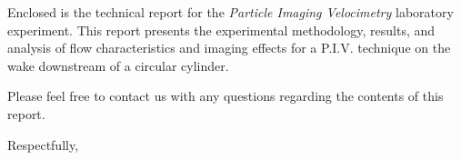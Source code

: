 



\fancyhead[C]{}
\fancyheadwidth[L]{0.5\headwidth}
\fancyheadwidth[C]{0.0\headwidth}
\fancyheadwidth[R]{0.5\headwidth}







\hypertarget{titlepage}{\maketitle}
\thispagestyle{empty}

\pagebreak


\thispagestyle{empty}

\DTMtoday

\vspace{5.0ex}

Enclosed is the technical report for the \textit{Particle Imaging Velocimetry} laboratory experiment. This report presents the experimental methodology, results, and analysis of flow characteristics and imaging effects for a P.I.V. technique on the wake downstream of a circular cylinder.

Please feel free to contact us with any questions regarding the contents of this report.

\vspace{5.0ex}

Respectfully,

